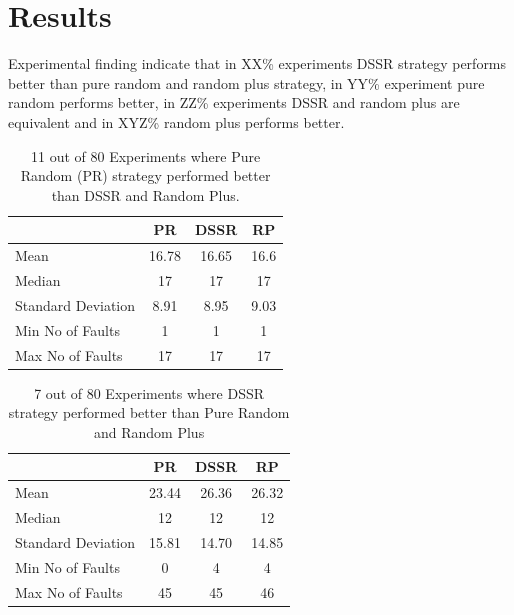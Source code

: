 \documentclass[conference]{IEEEtran}
\begin{document}

\section{Results}

Experimental finding indicate that in XX\% experiments DSSR strategy performs better than pure random and random plus strategy, in YY\% experiment pure random performs better, in ZZ\% experiments DSSR and random plus are equivalent and in XYZ\% random plus performs better. 

\begin{table}[H]
\caption{11 out of 80 Experiments where Pure Random (PR) strategy performed better than DSSR and Random Plus.}
\centering
\begin{tabular}{|l|c|c|c|}
\hline\hline
 				& PR			&  DSSR 			& RP \\[1ex]
\hline
Mean  			&    16.78		&  16.65			&  16.6\\
Median 			&    17    		&  17				&  17 \\
Standard Deviation 	&    8.91		&  8.95			&  9.03\\
Min No of Faults	&    1			&  1				&  1\\
Max No of Faults 	&    17		&  17				& 17\\
\hline
\end{tabular}
\label{table:result1}
\end{table}



\begin{table}[H]
\caption{7 out of 80 Experiments where DSSR strategy performed better than Pure Random and Random Plus}
\centering
\begin{tabular}{|l|c|c|c|}
\hline\hline
 				& PR			&  DSSR 			& RP \\[1ex]
\hline
Mean  			&    23.44		&  26.36			&  26.32\\
Median 			&    12 		&  12 			&  12 \\
Standard Deviation 	&    15.81		&  14.70			&  14.85\\
Min No of Faults	&    0			&  4				&  4\\
Max No of Faults 	&    45		&  45				&  46\\
\hline
\end{tabular}
\label{table:result2}
\end{table}
\end{document}
